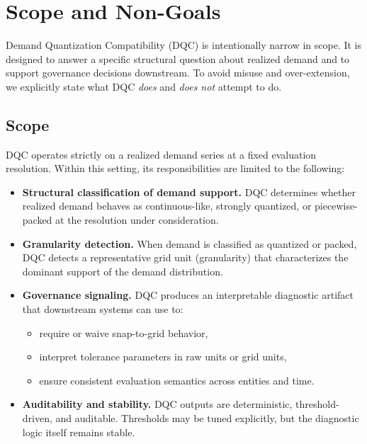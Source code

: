 
\section{Scope and Non-Goals}
\label{sec:dqc_scope_nongoals}

Demand Quantization Compatibility (DQC) is intentionally narrow in scope. It is
designed to answer a specific structural question about realized demand and to
support governance decisions downstream. To avoid misuse and over-extension, we
explicitly state what DQC \emph{does} and \emph{does not} attempt to do.

\subsection{Scope}

DQC operates strictly on a realized demand series at a fixed evaluation
resolution. Within this setting, its responsibilities are limited to the
following:

\begin{itemize}
  \item \textbf{Structural classification of demand support.}
  DQC determines whether realized demand behaves as continuous-like, strongly
  quantized, or piecewise-packed at the resolution under consideration.

  \item \textbf{Granularity detection.}
  When demand is classified as quantized or packed, DQC detects a
  representative grid unit (granularity) that characterizes the dominant
  support of the demand distribution.

  \item \textbf{Governance signaling.}
  DQC produces an interpretable diagnostic artifact that downstream systems can
  use to:
  \begin{itemize}
    \item require or waive snap-to-grid behavior,
    \item interpret tolerance parameters in raw units or grid units,
    \item ensure consistent evaluation semantics across entities and time.
  \end{itemize}

  \item \textbf{Auditability and stability.}
  DQC outputs are deterministic, threshold-driven, and auditable. Thresholds may
  be tuned explicitly, but the diagnostic logic itself remains stable.
\end{itemize}

